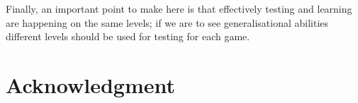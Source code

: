 \documentclass[conference]{IEEEtran}
\begin{document}
Finally, an important point to make here is that effectively testing and learning are happening on the same levels; if we are to see generalisational abilities different levels should be used for testing for each game. 

 
\section*{Acknowledgment}



 



\end{document}
